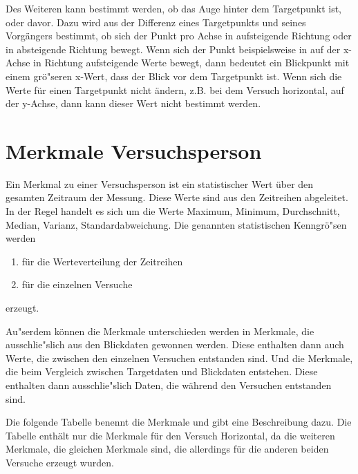Des Weiteren kann bestimmt werden, ob das Auge hinter dem Targetpunkt ist, oder davor. Dazu wird aus der Differenz eines Targetpunkts und seines Vorg\"angers bestimmt, ob sich der Punkt pro Achse in aufsteigende Richtung oder in absteigende Richtung bewegt. Wenn sich der Punkt beispielsweise in auf der x-Achse in Richtung aufsteigende Werte bewegt, dann bedeutet ein Blickpunkt mit einem gr\"o"seren x-Wert, dass der Blick vor dem Targetpunkt ist. Wenn sich die Werte f\"ur einen Targetpunkt nicht \"andern, z.B. bei dem Versuch horizontal, auf der y-Achse, dann kann dieser Wert nicht bestimmt werden.

\section{Merkmale Versuchsperson}

Ein Merkmal zu einer Versuchsperson ist ein statistischer Wert \"uber den gesamten Zeitraum der Messung. Diese Werte sind aus den Zeitreihen abgeleitet. In der Regel handelt es sich um die Werte Maximum, Minimum, Durchschnitt, Median, Varianz, Standardabweichung.
Die genannten statistischen Kenngr\"o"sen werden
\begin{enumerate}
	\item f\"ur die Werteverteilung der Zeitreihen
	\item f\"ur die einzelnen Versuche
\end{enumerate}
erzeugt.

Au"serdem k\"onnen die Merkmale unterschieden werden in Merkmale, die ausschlie"slich aus den Blickdaten gewonnen werden. Diese enthalten dann auch Werte, die zwischen den einzelnen Versuchen entstanden sind. Und die Merkmale, die beim Vergleich zwischen Targetdaten und Blickdaten entstehen. Diese enthalten dann ausschlie"slich Daten, die w\"ahrend den Versuchen entstanden sind.

Die folgende Tabelle benennt die Merkmale und gibt eine Beschreibung dazu. Die Tabelle enth\"alt nur die Merkmale f\"ur den Versuch Horizontal, da die weiteren Merkmale, die gleichen Merkmale sind, die allerdings f\"ur die anderen beiden Versuche erzeugt wurden.